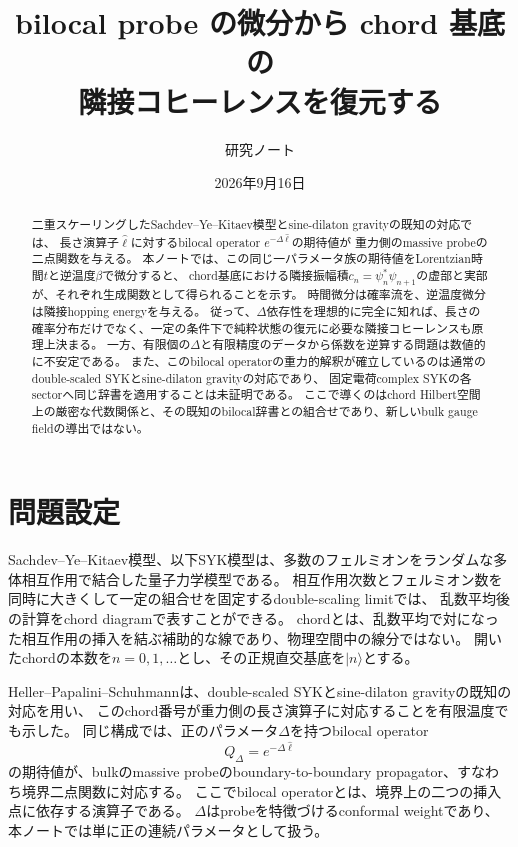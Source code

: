 \documentclass[a4paper,11pt]{ltjsarticle}
\title{bilocal probe の微分から chord 基底の\\隣接コヒーレンスを復元する}
\author{研究ノート}
\date{2026年9月16日}
\numberwithin{equation}{section}
\newcommand{\ket}[1]{\lvert #1\rangle}
\begin{document}
\maketitle
\begin{abstract}
二重スケーリングしたSachdev--Ye--Kitaev模型とsine-dilaton gravityの既知の対応では、
長さ演算子$\hat\ell$に対するbilocal operator $e^{-\Delta\hat\ell}$の期待値が
重力側のmassive probeの二点関数を与える。
本ノートでは、この同じ一パラメータ族の期待値をLorentzian時間$t$と逆温度$\beta$で微分すると、
chord基底における隣接振幅積$c_n=\psi_n^*\psi_{n+1}$の虚部と実部が、それぞれ生成関数として得られることを示す。
時間微分は確率流を、逆温度微分は隣接hopping energyを与える。
従って、$\Delta$依存性を理想的に完全に知れば、長さの確率分布だけでなく、一定の条件下で純粋状態の復元に必要な隣接コヒーレンスも原理上決まる。
一方、有限個の$\Delta$と有限精度のデータから係数を逆算する問題は数値的に不安定である。
また、このbilocal operatorの重力的解釈が確立しているのは通常のdouble-scaled SYKとsine-dilaton gravityの対応であり、
固定電荷complex SYKの各sectorへ同じ辞書を適用することは未証明である。
ここで導くのはchord Hilbert空間上の厳密な代数関係と、その既知のbilocal辞書との組合せであり、新しいbulk gauge fieldの導出ではない。
\end{abstract}
\setcounter{tocdepth}{1}
\tableofcontents
\clearpage

\section{問題設定}
Sachdev--Ye--Kitaev模型、以下SYK模型は、多数のフェルミオンをランダムな多体相互作用で結合した量子力学模型である。
相互作用次数とフェルミオン数を同時に大きくして一定の組合せを固定するdouble-scaling limitでは、
乱数平均後の計算をchord diagramで表すことができる。
chordとは、乱数平均で対になった相互作用の挿入を結ぶ補助的な線であり、物理空間中の線分ではない。
開いたchordの本数を$n=0,1,\ldots$とし、その正規直交基底を$\ket n$とする。

Heller--Papalini--Schuhmannは、double-scaled SYKとsine-dilaton gravityの既知の対応を用い、
このchord番号が重力側の長さ演算子に対応することを有限温度でも示した\cite{Heller}。
同じ構成では、正のパラメータ$\Delta$を持つbilocal operator
\begin{equation}
 Q_\Delta=e^{-\Delta\hat\ell}
 \label{eq:Qdef}
\end{equation}
の期待値が、bulkのmassive probeのboundary-to-boundary propagator、すなわち境界二点関数に対応する\cite{Heller}。
ここでbilocal operatorとは、境界上の二つの挿入点に依存する演算子である。
$\Delta$はprobeを特徴づけるconformal weightであり、本ノートでは単に正の連続パラメータとして扱う。
\end{document}
